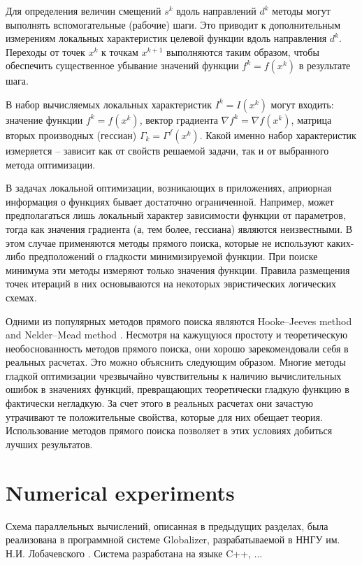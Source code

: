 \documentclass{svproc}
\begin{document}
Для определения величин смещений $s^k$ вдоль направлений $d^k$ методы могут выполнять вспомогательные (рабочие) шаги. Это приводит к дополнительным измерениям локальных характеристик целевой функции вдоль направления $d^k$. Переходы от точек $x^k$ к точкам $x^{k+1}$ выполняются таким образом, чтобы обеспечить существенное убывание значений функции $f^k = f( x^k )$ в результате шага.

В набор вычисляемых локальных характеристик $I^k=I(x^k)$ могут входить: значение функции $f^k = f( x^k )$, вектор градиента $\nabla f^k = \nabla f(x^k)$, матрица вторых производных (гессиан) $\Gamma_k=\Gamma^f(x^k)$. Какой именно набор характеристик измеряется -- зависит как от свойств решаемой задачи, так и от выбранного метода оптимизации.

В задачах локальной оптимизации, возникающих в приложениях, априорная информация о функциях бывает достаточно ограниченной. Например, может предполагаться лишь локальный характер зависимости функции от параметров, тогда как значения градиента (а, тем более, гессиана) являются неизвестными. В этом случае применяются методы прямого поиска, которые не используют каких-либо предположений о гладкости минимизируемой функции. При поиске минимума эти методы измеряют только значения функции. Правила размещения точек итераций в них основываются на некоторых эвристических логических схемах. 

Одними из популярных методов прямого поиска являются Hooke--Jeeves method \cite{HookJeeves} and Nelder--Mead method \cite{NelderMead}. Несмотря на кажущуюся простоту и теоретическую необоснованность методов прямого поиска, они хорошо зарекомендовали себя в реальных расчетах. Это можно объяснить следующим образом. Многие методы гладкой оптимизации чрезвычайно чувствительны к наличию вычислительных ошибок в значениях функций, превращающих теоретически гладкую функцию в фактически негладкую. За счет этого в реальных расчетах они зачастую утрачивают те положительные свойства, которые для них обещает теория. Использование методов прямого поиска позволяет в этих условиях добиться лучших результатов.



\section{Numerical experiments}

Схема параллельных вычислений, описанная в предыдущих разделах, была реализована в программной системе Globalizer, разрабатываемой в ННГУ им. Н.И. Лобачевского \cite{globalizerSystem,Sysoyev2017}. 
Система разработана на языке C++, ...
\end{document}
